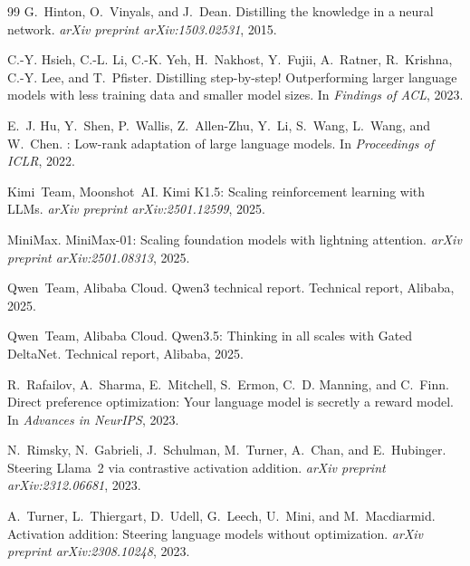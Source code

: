 \documentclass[11pt,a4paper]{article}
\begin{document}
\begin{thebibliography}{99}
G.~Hinton, O.~Vinyals, and J.~Dean.
\newblock Distilling the knowledge in a neural network.
\newblock \emph{arXiv preprint arXiv:1503.02531}, 2015.

C.-Y. Hsieh, C.-L. Li, C.-K. Yeh, H.~Nakhost, Y.~Fujii, A.~Ratner, R.~Krishna, C.-Y. Lee, and T.~Pfister.
\newblock Distilling step-by-step! Outperforming larger language models with less training data and smaller model sizes.
\newblock In \emph{Findings of ACL}, 2023.

E.~J. Hu, Y.~Shen, P.~Wallis, Z.~Allen-Zhu, Y.~Li, S.~Wang, L.~Wang, and W.~Chen.
: Low-rank adaptation of large language models.
\newblock In \emph{Proceedings of ICLR}, 2022.

Kimi~Team, Moonshot~AI.
\newblock Kimi K1.5: Scaling reinforcement learning with LLMs.
\newblock \emph{arXiv preprint arXiv:2501.12599}, 2025.

MiniMax.
\newblock MiniMax-01: Scaling foundation models with lightning attention.
\newblock \emph{arXiv preprint arXiv:2501.08313}, 2025.

Qwen~Team, Alibaba Cloud.
\newblock Qwen3 technical report.
\newblock Technical report, Alibaba, 2025.

Qwen~Team, Alibaba Cloud.
\newblock Qwen3.5: Thinking in all scales with Gated DeltaNet.
\newblock Technical report, Alibaba, 2025.

R.~Rafailov, A.~Sharma, E.~Mitchell, S.~Ermon, C.~D. Manning, and C.~Finn.
\newblock Direct preference optimization: Your language model is secretly a reward model.
\newblock In \emph{Advances in NeurIPS}, 2023.

N.~Rimsky, N.~Gabrieli, J.~Schulman, M.~Turner, A.~Chan, and E.~Hubinger.
\newblock Steering Llama~2 via contrastive activation addition.
\newblock \emph{arXiv preprint arXiv:2312.06681}, 2023.

A.~Turner, L.~Thiergart, D.~Udell, G.~Leech, U.~Mini, and M.~Macdiarmid.
\newblock Activation addition: Steering language models without optimization.
\newblock \emph{arXiv preprint arXiv:2308.10248}, 2023.


\end{thebibliography}
\end{document}
